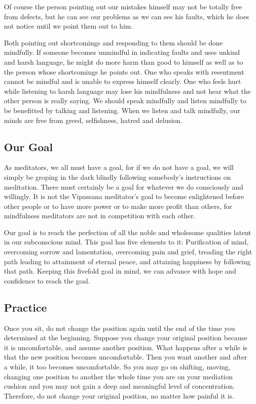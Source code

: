 Of course the person pointing out our mistakes himself may not be totally free
from defects, but he can see our problems as we can see his faults, which he
does not notice until we point them out to him.

Both pointing out shortcomings and responding to them should be done mindfully.
If someone becomes unmindful in indicating faults and uses unkind and harsh
language, he might do more harm than good to himself as well as to the person
whose shortcomings he points out. One who speaks with resentment cannot be
mindful and is unable to express himself clearly. One who feels hurt while
listening to harsh language may lose his mindfulness and not hear what the other
person is really saying. We should speak mindfully and listen mindfully to be
benefitted by talking and listening. When we listen and talk mindfully, our
minds are free from greed, selfishness, hatred and delusion.

\subsection*{Our Goal}
As meditators, we all must have a goal, for if we do not have a goal,
we will simply be groping in the dark blindly following somebody's instructions
on meditation. There must certainly be a goal for whatever we do consciously and
willingly. It is not the Vipassana meditator's goal to become enlightened before other people
or to have more power or to make more profit than others, for mindfulness
meditators are not in competition with each other.

Our goal is to reach the perfection of all the noble and wholesome qualities
latent in our subconscious mind. This goal has five elements to it: Purification
of mind, overcoming sorrow and lamentation, overcoming pain and grief, treading
the right path leading to attainment of eternal peace, and attaining happiness
by following that path. Keeping this fivefold goal in mind, we can advance with
hope and confidence to reach the goal.

\subsection*{Practice}
Once you sit, do not change the position again until the end of the
time you determined at the beginning. Suppose you change your original position
because it is uncomfortable, and assume another position. What happens after a
while is that the new position becomes uncomfortable. Then you want another and
after a while, it too becomes uncomfortable. So you may go on shifting, moving,
changing one position to another the whole time you are on your mediation
cushion and you may not gain a deep and meaningful level of concentration.
Therefore, do not change your original position, no matter how painful it is.

